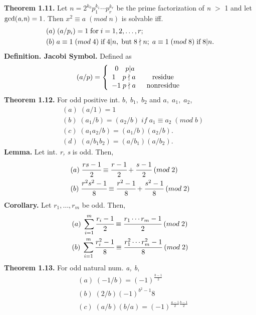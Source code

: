 \documentclass[a4paper,10pt]{article}
\begin{document}
\newpage
\textbf{Theorem 1.11.} Let $n = 2^{k_{0}}p_{1}^{k_{1}}\cdots p_{r}^{k_{r}}$ be the prime factorization of \textit{n} $>$ 1 and let $\textnormal{gcd}(\textit{a,n}) = 1$. Then $x^{2} \equiv a \; (mod \; n)$ is solvable iff.
\begin{align}
&(a) \; (a/p_{i}) = 1 \; \textnormal{for} \; i = 1, 2, \ldots, r; \\ 
&(b) \; a \equiv 1 \; (mod \; 4) \; \textnormal{if} \; 4|n, \; \textnormal{but} \; 8 \nmid n; \; a \equiv 1 \; (mod \; 8) \; \textnormal{if} \; 8|n.
\end{align}
\textbf{Definition. Jacobi Symbol.} Defined as
\begin{align}
(a/p) = \left \{ \begin{array}{cc} 0 \quad p|a \\ 1 \quad p\nmid a \; & \; \textnormal{residue} \\ -1 \; p\nmid a \; & \; \textnormal{nonresidue} \end{array} \right.
\end{align}
\textbf{Theorem 1.12.} For odd positive int. \textit{$b, \;b_{1}, \; b_{2}$} and \textit{$a, \;a_{1}, \; a_{2}$},
\begin{align}
&(a) \; (a/1) = 1 \\
&(b) \; (a_{1}/b)=(a_{2}/b) \; if \; a_{1} \equiv a_{2} \; (mod \; b) \\
&(c) \; (a_{1}a_{2}/b)=(a_{1}/b)(a_{2}/b). \\ 
&(d) \; (a/b_{1}b_{2})=(a/b_{1})(a/b_{2}). 
\end{align}
\textbf{Lemma.} Let int. \textit{r, \; s} is odd. Then,
\begin{align}
&(a) \; \cfrac{rs-1}{2} \equiv \cfrac{r-1}{2}+\cfrac{s-1}{2} \; (mod \; 2) \\
&(b) \; \cfrac{r^{2}s^{2}-1}{8} \equiv \cfrac{r^{2}-1}{8}+\cfrac{s^{2}-1}{8} \; (mod \; 2)
\end{align}
\textbf{Corollary.} Let \textit{$r_{1}, \ldots, r_{m}$} be odd. Then,
\begin{align}
&(a) \; \sum^{m}_{i=1}\cfrac{r_{i}-1}{2} \equiv \cfrac{r_{1}\cdots r_{m}-1}{2} \; (mod \; 2) \\
&(b) \; \sum^{m}_{i=1}\cfrac{r_{i}^{2}-1}{8} \equiv \cfrac{r_{1}^{2}\cdots r_{m}^{2}-1}{8} \; (mod \; 2)
\end{align}
\textbf{Theorem 1.13.} For odd natural num. \textit{a, \; b},
\begin{align}
&(a) \; (-1/b) = (-1)^{\frac{b-1}{2}} \\ 
&(b) \; (2/b) (-1)^{b^{2}-1}{8} \\
&(c) \; (a/b)(b/a) = (-1)^{\frac{a-1}{2}\frac{b-1}{2}}
\end{align}
\end{document}
